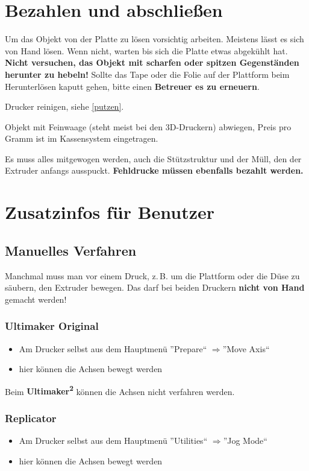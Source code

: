 \documentclass{\basedir/fablab-document}
\newcommand{\ts}[1]{\textsuperscript{#1}}
\newcommand{\ra}{$\Rightarrow$}
\begin{document}
\section{Bezahlen und abschließen}

Um das Objekt von der Platte zu lösen vorsichtig arbeiten. Meistens lässt es sich von Hand lösen. Wenn nicht,
warten bis sich die Platte etwas abgekühlt hat. \textbf{Nicht versuchen, das Objekt mit scharfen oder spitzen Gegenständen herunter zu hebeln!}
Sollte das Tape oder die Folie auf der Plattform beim Herunterlösen kaputt gehen, bitte einen \textbf{Betreuer es zu erneuern}.

Drucker reinigen, siehe \ref{putzen}.

Objekt mit Feinwaage (steht meist bei den 3D-Druckern) abwiegen, Preis pro Gramm ist im Kassensystem eingetragen.

Es muss alles mitgewogen werden, auch die Stützstruktur und der Müll, den der Extruder anfangs ausspuckt. \textbf{Fehldrucke müssen ebenfalls bezahlt werden.}
\pagebreak


\section{Zusatzinfos für Benutzer}

\subsection{Manuelles Verfahren}\label{manuelles-verfahren}
Manchmal muss man vor einem Druck, z.\,B. um die Plattform oder die Düse zu säubern, den Extruder bewegen.
Das darf bei beiden Druckern \textbf{nicht von Hand} gemacht werden!

\subsubsection{Ultimaker Original}
\begin{itemize}
	\item Am Drucker selbst aus dem Hauptmenü ''Prepare`` \ra ''Move Axis``
	\item hier können die Achsen bewegt werden
\end{itemize}
Beim \textbf{Ultimaker\ts2} können die Achsen nicht verfahren werden.

\subsubsection{Replicator}
\begin{itemize}
 \item Am Drucker selbst aus dem Hauptmenü ''Utilities`` \ra ''Jog Mode``
 \item hier können die Achsen bewegt werden
\end{itemize}
\end{document}
